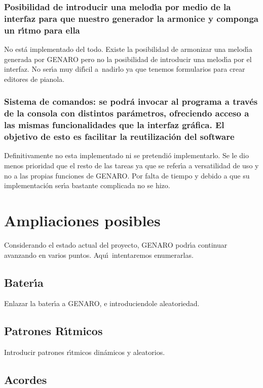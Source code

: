 \documentclass[a4paper,11pt]{article}
\begin{document}
\subsubsection{Posibilidad de introducir una melod\'\i a por medio de la interfaz para que nuestro generador la armonice y componga un r\'\i tmo para ella}
No est\'a implementado del todo. Existe la posibilidad de armonizar una melod\'\i a generada por GENARO 
pero no la posibilidad de introducir una melod\'\i a por el interfaz. No ser\'\i a muy dif\'\i cil a~nadirlo ya que tenemos formularios para crear editores de pianola.

\subsubsection{Sistema de comandos: se podr\'a invocar al programa a trav\'es de la consola con distintos par\'ametros, ofreciendo acceso a las mismas funcionalidades que la interfaz gr\'afica. El objetivo de esto es facilitar la reutilizaci\'on del software}
Definitivamente no esta implementado ni se pretendi\'o implementarlo. Se le dio menos prioridad que el resto
de las tareas ya que se refer\'\i a a versatilidad de uso y no a las propias funciones de GENARO. Por falta
de tiempo y debido a que su implementaci\'on ser\'\i a bastante complicada no se hizo.


\section{Ampliaciones posibles}

Considerando el estado actual del proyecto, GENARO podr\'\i a continuar avanzando en varios puntos. Aqu\'\i ~intentaremos enumerarlas.

\subsection{Bater\'\i a}

Enlazar la bater\'\i a a GENARO, e introduciendole aleatoriedad.

\subsection{Patrones R\'\i tmicos}

Introducir patrones r\'\i tmicos din\'amicos y aleatorios.

\subsection {Acordes}
\end{document}
